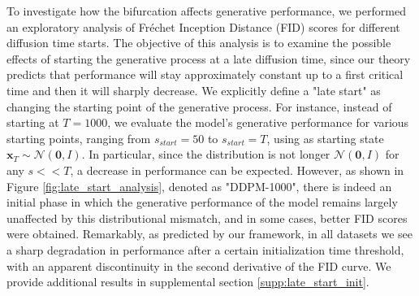 \documentclass{article}
\newcommand{\vect}[1]{\boldsymbol{#1}}
\begin{document}
To investigate how the bifurcation affects generative performance, we performed an exploratory analysis of Fréchet Inception Distance (FID) scores for different diffusion time starts. The objective of this analysis is to examine the possible effects of starting the generative process at a late diffusion time, since our theory predicts that performance will stay approximately constant up to a first critical time and then it will sharply decrease. We explicitly define a "late start" as changing the starting point of the generative process. For instance, instead of starting at $T=1000$, we evaluate the model's generative performance for various starting points, ranging from $s_{start} = 50$ to $s_{start} = T$, using as starting state $\mathbf{x}_T \sim \mathcal{N}(\vect{0},I)$. In particular, since the distribution is not longer $ \mathcal{N}(\vect{0},I)$ for any $s<<T$, a decrease in performance can be expected. However, as shown in Figure \ref{fig:late_start_analysis}, denoted as "DDPM-1000", there is indeed an initial phase in which the generative performance of the model remains largely unaffected by this distributional mismatch, and in some cases, better FID scores were obtained. Remarkably, as predicted by our framework, in all datasets we see a sharp degradation in performance after a certain initialization time threshold, with an apparent discontinuity in the second derivative of the FID curve. We provide additional results in supplemental section \ref{supp:late_start_init}.
\end{document}
